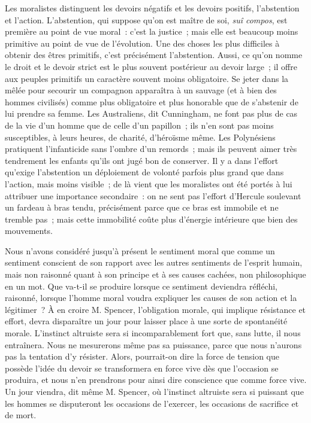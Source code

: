 \documentclass[french,twoside]{book} %
\begin{document}
Les moralistes distinguent les devoirs négatifs et les devoirs positifs, l’abstention et l’action. L’abstention, qui suppose qu’on est maître de soi, \emph{suî compos}, est première au point de vue moral : c’est la justice ; mais elle est beaucoup moins primitive au point de vue de l’évolution. Une des choses les plus difficiles à obtenir des êtres primitifs, c’est précisément l’abstention. Aussi, ce qu’on nomme le droit et le devoir strict est le plus souvent postérieur au devoir large ; il offre aux peuples primitifs un caractère souvent moins obligatoire. Se jeter dans la mêlée pour secourir un compagnon apparaîtra à un sauvage (et à bien des hommes civilisés) comme plus obligatoire et plus honorable que de s’abstenir de lui prendre sa femme. Les Australiens, dit Cunningham, ne font pas plus de cas de la vie d’un homme que de celle d’un papillon ; ils n’en sont pas moins susceptibles, à leurs heures, de charité, d’héroïsme même. Les Polynésiens pratiquent l’infanticide sans l’ombre d’un remords ; mais ils peuvent aimer très tendrement les enfants qu’ils ont jugé bon de conserver. Il y a dans l’effort qu’exige l’abstention un déploiement de volonté parfois plus grand que dans l’action, mais moins visible ; de là vient que les moralistes ont été portés à lui attribuer une importance secondaire : on ne sent pas l’effort d’Hercule soulevant un fardeau à bras tendu, précisément parce que ce bras est immobile et ne tremble pas ; mais cette immobilité coûte plus d’énergie intérieure que bien des mouvements.\par
Nous n’avons considéré jusqu’à présent le sentiment moral que comme un sentiment conscient de son rapport avec les autres sentiments de l’esprit humain, mais non raisonné quant à son principe et à ses causes cachées, non philosophique en un mot. Que va-t-il se produire lorsque ce sentiment deviendra réfléchi, raisonné, lorsque l’homme moral voudra expliquer les causes de son action et la légitimer ? À en croire M. Spencer, l’obligation morale, qui implique résistance et effort, devra disparaître un jour pour laisser place à une sorte de spontanéité morale. L’instinct altruiste sera si incomparablement fort que, sans lutte, il nous entraînera. Nous ne mesurerons même pas sa puissance, parce que nous n’aurons pas la tentation d’y résister. Alors, pourrait-on dire la force de tension que possède l’idée du devoir se transformera en force vive dès que l’occasion se produira, et nous n’en prendrons pour ainsi dire conscience que comme force vive. Un jour viendra, dit même M. Spencer, où l’instinct altruiste sera si puissant que les hommes se disputeront les occasions de l’exercer, les occasions de sacrifice et de mort.\par
\end{document}
